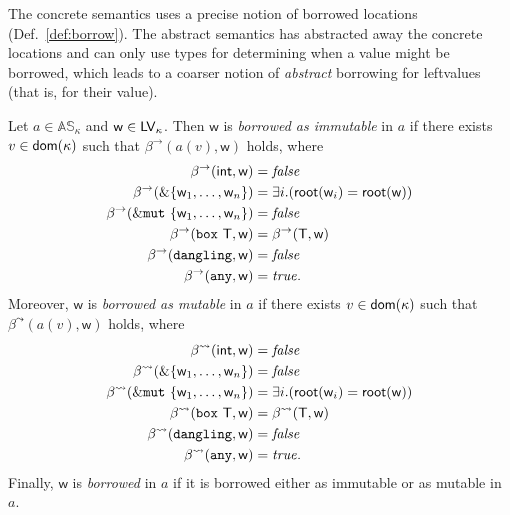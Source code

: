 The concrete semantics uses a precise notion of borrowed locations
(Def.~\ref{def:borrow}). The abstract semantics has abstracted away the concrete locations
and can only use types for determining when a value might be borrowed, which leads
to a coarser notion of \emph{abstract} borrowing for leftvalues (that is, for their value).

\begin{definition}\label{def:abstract_borrow}
  Let $a\in\mathbb{AS}_\kappa$ and $\mathsf{w}\in\mathsf{LV}_\kappa$.
  Then $\mathsf{w}$ is
  \emph{borrowed as immutable} in $a$ if there exists $v\in\mathsf{dom}(\kappa)$ such that
  $\beta^\to(a(v),\mathsf{w})$ holds, where
  \begin{align*}
    \beta^\to(\mathsf{int},\mathsf{w})&=\mathit{false}\\
    \beta^\to(\borrow\{\mathsf{w}_1,\ldots,\mathsf{w}_n\})&=\exists i.(\mathsf{root}(\mathsf{w}_i)=\mathsf{root}(\mathsf{w}))\\
    \beta^\to(\mutborrow\{\mathsf{w}_1,\ldots,\mathsf{w}_n\})&=\mathit{false}\\
    \beta^\to(\mathtt{box}\ \mathsf{T},\mathsf{w})&=\beta^\to(\mathsf{T},\mathsf{w})\\
    \beta^\to(\mathtt{dangling},\mathsf{w})&=\mathit{false}\\
    \beta^\to(\mathtt{any},\mathsf{w})&=\mathit{true}.
  \end{align*}
  Moreover, $\mathsf{w}$ is
  \emph{borrowed as mutable} in $a$ if there exists $v\in\mathsf{dom}(\kappa)$ such that
  $\beta^\leadsto(a(v),\mathsf{w})$ holds, where
  \begin{align*}
    \beta^\leadsto(\mathsf{int},\mathsf{w})&=\mathit{false}\\
    \beta^\leadsto(\borrow\{\mathsf{w}_1,\ldots,\mathsf{w}_n\})&=\mathit{false}\\
    \beta^\leadsto(\mutborrow\{\mathsf{w}_1,\ldots,\mathsf{w}_n\})&=\exists i.(\mathsf{root}(\mathsf{w}_i)=\mathsf{root}(\mathsf{w}))\\
    \beta^\leadsto(\mathtt{box}\ \mathsf{T},\mathsf{w})&=\beta^\leadsto(\mathsf{T},\mathsf{w})\\
    \beta^\leadsto(\mathtt{dangling},\mathsf{w})&=\mathit{false}\\
    \beta^\leadsto(\mathtt{any},\mathsf{w})&=\mathit{true}.
  \end{align*}
  Finally, $\mathsf{w}$ is \emph{borrowed} in $a$ if it is borrowed either as immutable
  or as mutable in $a$.
\end{definition}

